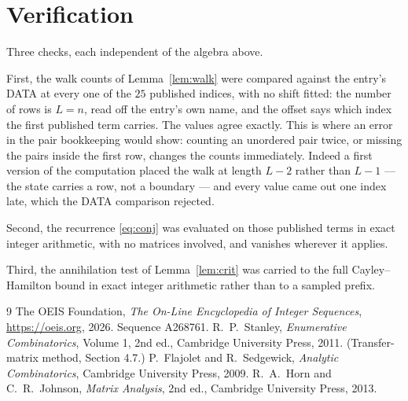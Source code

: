 \documentclass[11pt,a4paper]{article}
\theoremstyle{plain}
\theoremstyle{definition}
\begin{document}
\section{Verification}

Three checks, each independent of the algebra above.

First, the walk counts of Lemma~\ref{lem:walk} were compared against the entry's DATA at
every one of the $25$ published indices, with no shift fitted: the number of rows is
$L=n$, read off the entry's own name, and the offset says which index the first
published term carries. The values agree exactly. This is where an error in the pair
bookkeeping would show: counting an unordered pair twice, or missing the pairs inside the
first row, changes the counts immediately. Indeed a first version of the computation
placed the walk at length $L-2$ rather than $L-1$ --- the state carries a row, not a
boundary --- and every value came out one index late, which the DATA comparison rejected.

Second, the recurrence \eqref{eq:conj} was evaluated on those published terms in exact
integer arithmetic, with no matrices involved, and vanishes wherever it applies.

Third, the annihilation test of Lemma~\ref{lem:crit} was carried to the full
Cayley--Hamilton bound in exact integer arithmetic rather than to a sampled prefix.

\begin{thebibliography}{9}
 The OEIS Foundation, \emph{The On-Line Encyclopedia of Integer
Sequences}, \url{https://oeis.org}, 2026. Sequence A268761.
 R.~P.~Stanley, \emph{Enumerative Combinatorics}, Volume 1, 2nd ed.,
Cambridge University Press, 2011. (Transfer-matrix method, Section 4.7.)
 P.~Flajolet and R.~Sedgewick, \emph{Analytic Combinatorics}, Cambridge
University Press, 2009.
 R.~A.~Horn and C.~R.~Johnson, \emph{Matrix Analysis}, 2nd ed., Cambridge
University Press, 2013.
\end{thebibliography}
\end{document}

